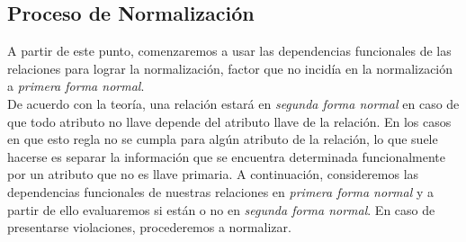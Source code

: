\documentclass[11pt,letterpaper]{article}
\begin{document}
\subsection{Proceso de Normalización}

A partir de este punto, comenzaremos a usar las dependencias funcionales de las relaciones para lograr la normalización, factor que no incidía en la normalización a \textit{primera forma normal}. \\

De acuerdo con la teoría, una relación estará en \textit{segunda forma normal} en caso de que todo atributo no llave depende del atributo llave de la relación. En los casos en que esto regla no se cumpla para algún atributo de la relación, lo que suele hacerse es separar la información que se encuentra determinada funcionalmente por un atributo que no es llave primaria. A continuación, consideremos las dependencias funcionales de nuestras relaciones en \textit{primera forma normal} y a partir de ello evaluaremos si están o no en \textit{segunda forma normal}. En caso de presentarse violaciones, procederemos a normalizar.
\end{document}
